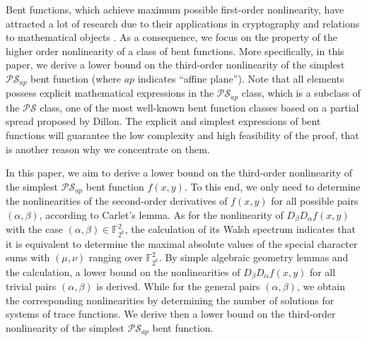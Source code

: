 \documentclass{article}
\newcommand{\F}{\mathbb{F}}
\newcommand{\0}{\textbf{0}}
\newcommand{\1}{\textbf{1}}
\theoremstyle{plain}
\begin{document}
    Bent functions, which achieve maximum possible first-order nonlinearity, 
    have attracted a lot of research due to their applications in cryptography and relations to mathematical objects \cite{Carlet2020book}. 
    As a consequence, we focus on the property of the higher order nonlinearity of a class of bent functions. 
    More specifically, in this paper, we derive a lower bound on the third-order nonlinearity of the simplest $\mathcal{PS}_{ap}$ bent function (where $ap$ indicates ``affine plane'').  
    Note that all elements possess explicit mathematical expressions in the $\mathcal{PS}_{ap}$ class, which is a subclass of the $\mathcal{PS}$ class, one of the most well-known bent function classes based on a partial spread proposed by Dillon. 
    The explicit and simplest expressions of bent functions will guarantee the low complexity and high feasibility of the proof, that is another reason why we concentrate on them. 

    In this paper, we aim to derive a lower bound on the third-order nonlinearity of the simplest $\mathcal{PS}_{ap}$ bent function $f(x,y)$.
    To this end, we only need to determine the nonlinearities of the second-order derivatives of $f(x,y)$ for all possible pairs $(\alpha,\beta)$, according to Carlet's lemma.
    As for the nonlinearity of $D_{\beta}D_{\alpha}f(x,y)$ with the case $(\alpha,\beta)\in\F_{2^k}^2$, the calculation of its Walsh spectrum indicates that it is equivalent to determine the maximal absolute values of the special character sums with $(\mu,\nu)$ ranging over $\F_{2^k}^2$.
    By simple algebraic geometry lemmas and the calculation, a lower bound on the nonlinearities of $D_{\beta}D_{\alpha}f(x,y)$ for all trivial pairs $(\alpha,\beta)$ is derived.
    While for the general pairs $(\alpha,\beta)$, we obtain the corresponding nonlinearities by determining the number of solutions for systems of trace functions.
    We derive then a lower bound on the third-order nonlinearity of the simplest $\mathcal{PS}_{ap}$ bent function.
\end{document}
